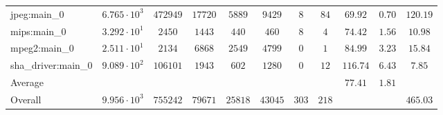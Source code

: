 \begin{tabular}{|l|c|c|c|c|c|c|c|c|c|c|}
jpeg:main\_0            & $ 6.765 \cdot 10^{3} $ & $ 472949 $ & $ 17720 $ & $ 5889  $ & $ 9429  $ & $ 8   $ & $ 84  $ & $ 69.92       $ & $ 0.70    $ & $ 120.19  $ \\
mips:main\_0            & $ 3.292 \cdot 10^{1} $ & $ 2450   $ & $ 1443  $ & $ 440   $ & $ 460   $ & $ 8   $ & $ 4   $ & $ 74.42       $ & $ 1.56    $ & $ 10.98   $ \\
mpeg2:main\_0           & $ 2.511 \cdot 10^{1} $ & $ 2134   $ & $ 6868  $ & $ 2549  $ & $ 4799  $ & $ 0   $ & $ 1   $ & $ 84.99       $ & $ 3.23    $ & $ 15.84   $ \\
sha\_driver:main\_0     & $ 9.089 \cdot 10^{2} $ & $ 106101 $ & $ 1943  $ & $ 602   $ & $ 1280  $ & $ 0   $ & $ 12  $ & $ 116.74      $ & $ 6.43    $ & $ 7.85    $ \\
\hline
Average                 & $                    $ & $        $ & $       $ & $       $ & $       $ & $     $ & $     $ & $ 77.41       $ & $ 1.81    $ & $         $ \\
\hline
Overall                 & $ 9.956 \cdot 10^{3} $ & $ 755242 $ & $ 79671 $ & $ 25818 $ & $ 43045 $ & $ 303 $ & $ 218 $ & $             $ & $         $ & $ 465.03  $ \\
\hline
\end{tabular}
